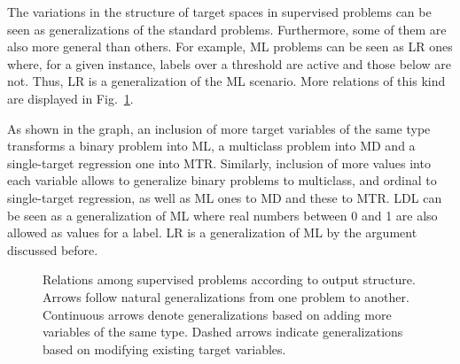 The variations in the structure of target spaces in supervised problems can be seen as generalizations of the standard problems. Furthermore, some of them are also more general than others. For example, ML problems can be seen as LR ones where, for a given instance, labels over a threshold are active and those below are not. Thus, LR is a generalization of the ML scenario. More relations of this kind are displayed in Fig.~\ref{p3fig.mouttax}.

As shown in the graph, an inclusion of more target variables of the same type transforms a binary problem into ML, a multiclass problem into MD and a single-target regression one into MTR. Similarly, inclusion of more values into each variable allows to generalize binary problems to multiclass, and ordinal to single-target regression, as well as ML ones to MD and these to MTR. LDL can be seen as a generalization of ML where real numbers between 0 and 1 are also allowed as values for a label. LR is a generalization of ML by the argument discussed before.

\begin{figure}[ht]
\centering\scriptsize
{}
\caption[Relations among supervised problems according to output structure.]{\label{p3fig.mouttax}Relations among supervised problems according to output structure. Arrows follow natural generalizations from one problem to another. Continuous arrows denote generalizations based on adding more variables of the same type. Dashed arrows indicate generalizations based on modifying existing target variables.}
\end{figure}

